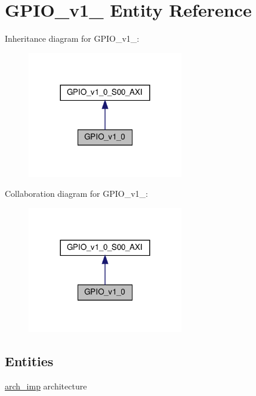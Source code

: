\hypertarget{classGPIO__v1__0}{}\section{G\+P\+I\+O\+\_\+v1\+\_ Entity Reference}
\label{classGPIO__v1__0}


Inheritance diagram for G\+P\+I\+O\+\_\+v1\+\_\+:\nopagebreak
\begin{figure}[H]
\begin{center}
\leavevmode
\includegraphics[width=192pt]{classGPIO__v1__0__inherit__graph}
\end{center}
\end{figure}


Collaboration diagram for G\+P\+I\+O\+\_\+v1\+\_\+:\nopagebreak
\begin{figure}[H]
\begin{center}
\leavevmode
\includegraphics[width=192pt]{classGPIO__v1__0__coll__graph}
\end{center}
\end{figure}
\subsection*{Entities}
\begin{DoxyCompactItemize}
\item 
\hyperlink{classGPIO__v1__0_1_1arch__imp}{arch\+\_\+imp} architecture
\end{DoxyCompactItemize}
